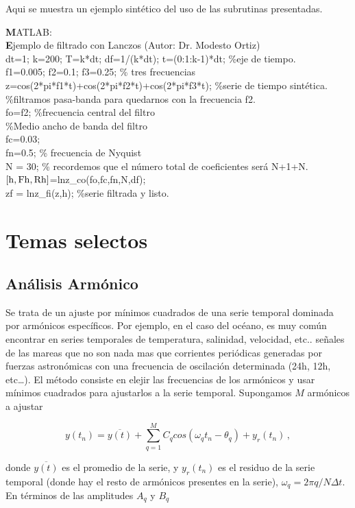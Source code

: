 \documentclass[
]{agujournal2019}
\begin{document}
Aqui se muestra un ejemplo sintético del uso de las subrutinas
presentadas.

\begin{framed}
{\noindent \textbf MATLAB:}\\
{\textbf Ejemplo de filtrado con Lanczos (Autor: Dr. Modesto Ortiz)}\\
{\noindent}dt=1; k=200; T=k*dt; df=1/(k*dt); t=(0:1:k-1)*dt; \%eje de tiempo.\\
f1=0.005; f2=0.1; f3=0.25; \% tres frecuencias\\
z=cos(2*pi*f1*t)+cos(2*pi*f2*t)+cos(2*pi*f3*t); \%serie de tiempo sintética.
\\
\%filtramos pasa-banda para quedarnos con la frecuencia f2. \\
fo=f2; \%frecuencia central del filtro\\
\%Medio ancho de banda del filtro \\
fc=0.03;\\
fn=0.5; \% frecuencia de Nyquist\\
N = 30; \% recordemos que el número total de coeficientes será N+1+N. \\
$[{\rm h},{\rm Fh},{\rm Rh}]$=lnz\_co(fo,fc,fn,N,df);\\
zf = lnz\_fi(z,h); \%serie filtrada y listo.
\end{framed}

\section{Temas selectos}
\subsection{\textbf \noindent Análisis Armónico}

Se trata de un ajuste por mínimos cuadrados de una serie temporal
dominada por armónicos específicos. Por ejemplo, en el caso del océano,
es muy común encontrar en series temporales de temperatura, salinidad,
velocidad, etc.. señales de las mareas que no son nada mas que
corrientes periódicas generadas por fuerzas astronómicas con una
frecuencia de oscilación determinada (24h, 12h, etc\ldots). El método
consiste en elejir las frecuencias de los armónicos y usar mínimos
cuadrados para ajustarlos a la serie temporal. Supongamos \(M\)
armónicos a ajustar

\[y(t_n) = \overline{y(t)} + \sum\limits^{M}_{q=1}C_q cos(\omega_q t_n -\theta_q)+y_r(t_n)\,,\]

donde \(\overline{y(t)}\) es el promedio de la serie, y \(y_r(t_n)\) es
el residuo de la serie temporal (donde hay el resto de armónicos
presentes en la serie), \(\omega_q=2\pi q/N\Delta t\). En términos de
las amplitudes \(A_q\) y \(B_q\)
\end{document}
